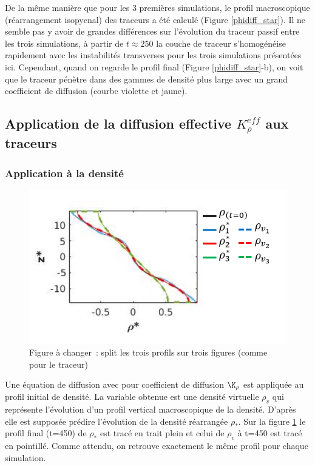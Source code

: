 \documentclass[a4paper,12pt]{article}
\begin{document}
    De la même manière que pour les 3 premières simulations, le profil macroscopique (réarrangement isopycnal) des traceurs a été calculé (Figure \ref{phidiff_star}). Il ne semble pas y avoir de grandes différences sur l'évolution du traceur passif entre les trois simulations, à partir de $t\approx250$ la couche de traceur s'homogénéise rapidement avec les instabilités transverses pour les trois simulations présentées ici. Cependant, quand on regarde le profil final (Figure \ref{phidiff_star}-b), on voit que le traceur pénètre dans des gammes de densité plus large avec un grand coefficient de diffusion (courbe violette et jaune).
    
  \subsection{Application de la diffusion effective $K_{\rho}^{eff}$ aux traceurs}
  
    \subsubsection{Application à la densité}
    \begin{figure}[!h]
            \centering
            \includegraphics[width=0.5\linewidth]{figures/profils_Krho_rho.png}
            \caption{Figure à changer : split les trois profils sur trois figures (comme pour le traceur)}
            \label{profils_Krho_rho}
    \end{figure}
    
    Une équation de diffusion avec pour coefficient de diffusion $\K_\rho$ est appliquée au profil initial de densité. La variable obtenue est une densité virtuelle $\rho_v$ qui représente l'évolution d'un profil vertical macroscopique de la densité. D'après \cite{penney_diapycnal_2020} elle est supposée prédire l'évolution de la densité réarrangée $\rho_*$. Sur la figure \ref{profils_Krho_rho} le profil final (t=450) de $\rho_*$ est tracé en trait plein et celui de $\rho_v$ à t=450 est tracé en pointillé. Comme attendu, on retrouve exactement le même profil pour chaque simulation.
    
\end{document}
